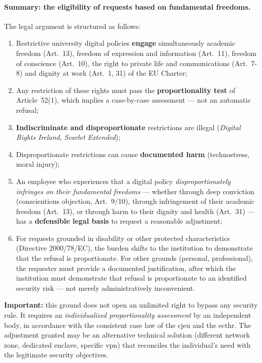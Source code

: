 \paragraph{Summary: the eligibility of requests based on
fundamental freedoms.}

The legal argument is structured as follows:

\begin{enumerate}
    \item Restrictive university digital policies
    \textbf{engage} simultaneously academic freedom (Art.~13),
    freedom of expression and information (Art.~11), freedom of
    conscience (Art.~10), the right to private life and
    communications (Art.~7-8) and dignity at work (Art.~1, 31)
    of the EU Charter;
    \item Any restriction of these rights must pass the
    \textbf{proportionality test} of Article~52(1), which
    implies a case-by-case assessment --- not an automatic refusal;
    \item \textbf{Indiscriminate and
    disproportionate} restrictions are illegal (\emph{Digital Rights Ireland},
    \emph{Scarlet Extended});
    \item Disproportionate restrictions can cause
    \textbf{documented harm} (technostress, moral injury);
    \item An employee who experiences that a digital policy
    \emph{disproportionately infringes on their fundamental freedoms}
    --- whether through deep conviction (conscientious objection,
    Art.~9/10), through infringement of their academic freedom
    (Art.~13), or through harm to their dignity and health (Art.~31) ---
    has a \textbf{defensible legal basis} to request
    a reasonable adjustment;
    \item For requests grounded in disability or other protected
    characteristics (Directive 2000/78/EC), the burden shifts to the
    institution to demonstrate that the refusal is proportionate. For
    other grounds (personal, professional), the requester must provide
    a documented justification, after which the institution must
    demonstrate that refusal is proportionate to an identified security
    risk --- not merely administratively inconvenient.
\end{enumerate}

\textbf{Important:} this ground does not open an unlimited right to
bypass any security rule. It requires an \emph{individualized
proportionality assessment} by an independent body,
in accordance with the consistent case law of the \gls{cjeu} and the \gls{ecthr}.
The adjustment granted may be an alternative technical solution
(different network zone, dedicated enclave, specific \gls{vpn}) that reconciles
the individual's need with the legitimate security objectives.

